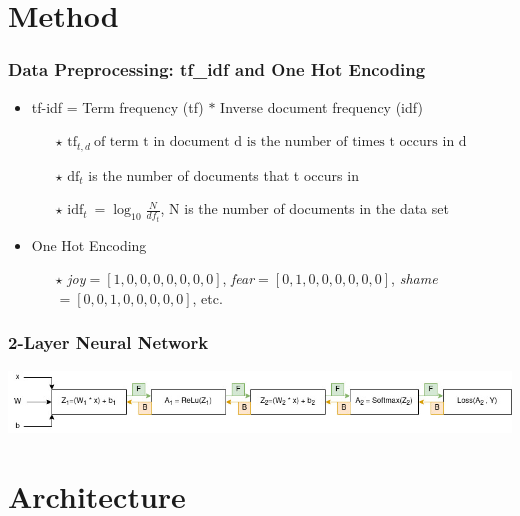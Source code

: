 \documentclass[aspectratio=169]{beamer}
\begin{document}
\section{Method}
\begin{frame}
\frametitle{Data Preprocessing: tf\_idf and One Hot Encoding}

\begin{itemize}

\item tf-idf = Term frequency (tf) $*$ Inverse document frequency (idf)

\begin{itemize}
\setlength\itemsep{0.4em}
\item [$\star$] $ \text{tf}_{t,d} \: \text{of term t in document d is the number of times t occurs in d} $
\item [$\star$] $\text{df}_t$ is the number of documents that t occurs in


\item [$\star$] $ \text{idf}_t \:=\log_{10}\frac{N}{df_t}$, N is the number of documents in the data set
\end{itemize}
\setlength\itemsep{0.8em}
\item One Hot Encoding

\begin{itemize}
\item [$\star$] \emph{joy}$=[1,0,0,0,0,0,0,0]$, \emph{fear}$=[0,1,0,0,0,0,0,0]$, \emph{shame}$=[0,0,1,0,0,0,0,0]$, etc.
\end{itemize}
\end{itemize}
\end{frame}

\begin{frame}
\frametitle{2-Layer Neural Network}

\includegraphics[scale=0.5]{Method_TeamLab.jpg}

\end{frame}



\section{Architecture}
\end{document}
